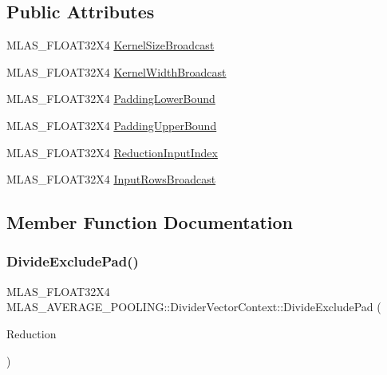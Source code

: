 \subsection*{Public Attributes}
\begin{DoxyCompactItemize}
\item 
M\+L\+A\+S\+\_\+\+F\+L\+O\+A\+T32\+X4 \mbox{\hyperlink{structMLAS__AVERAGE__POOLING_1_1DividerVectorContext_a1ad2dbb551925e83854445d1c4eb8b70}{Kernel\+Size\+Broadcast}}
\item 
M\+L\+A\+S\+\_\+\+F\+L\+O\+A\+T32\+X4 \mbox{\hyperlink{structMLAS__AVERAGE__POOLING_1_1DividerVectorContext_abd7a8d2db904cadf2c559e45b9908f88}{Kernel\+Width\+Broadcast}}
\item 
M\+L\+A\+S\+\_\+\+F\+L\+O\+A\+T32\+X4 \mbox{\hyperlink{structMLAS__AVERAGE__POOLING_1_1DividerVectorContext_a4d567668e709312e2d5daf90396fd16c}{Padding\+Lower\+Bound}}
\item 
M\+L\+A\+S\+\_\+\+F\+L\+O\+A\+T32\+X4 \mbox{\hyperlink{structMLAS__AVERAGE__POOLING_1_1DividerVectorContext_aab756d55cf696abdcc7a73ba52f52090}{Padding\+Upper\+Bound}}
\item 
M\+L\+A\+S\+\_\+\+F\+L\+O\+A\+T32\+X4 \mbox{\hyperlink{structMLAS__AVERAGE__POOLING_1_1DividerVectorContext_a46745314ba7c7c6c86561518e482c226}{Reduction\+Input\+Index}}
\item 
M\+L\+A\+S\+\_\+\+F\+L\+O\+A\+T32\+X4 \mbox{\hyperlink{structMLAS__AVERAGE__POOLING_1_1DividerVectorContext_aec528e5cbdcfd22b54a9348767f565cf}{Input\+Rows\+Broadcast}}
\end{DoxyCompactItemize}


\subsection{Member Function Documentation}
\mbox{\label{structMLAS__AVERAGE__POOLING_1_1DividerVectorContext_af84617d659675316dd60a216b7cd1225}} 
\subsubsection{\texorpdfstring{Divide\+Exclude\+Pad()}{DivideExcludePad()}}
{\footnotesize\ttfamily M\+L\+A\+S\+\_\+\+F\+L\+O\+A\+T32\+X4 M\+L\+A\+S\+\_\+\+A\+V\+E\+R\+A\+G\+E\+\_\+\+P\+O\+O\+L\+I\+N\+G\+::\+Divider\+Vector\+Context\+::\+Divide\+Exclude\+Pad (\begin{DoxyParamCaption}\item[{M\+L\+A\+S\+\_\+\+F\+L\+O\+A\+T32\+X4}]{Reduction }\end{DoxyParamCaption})\hspace{0.3cm}{\ttfamily [inline]}}


